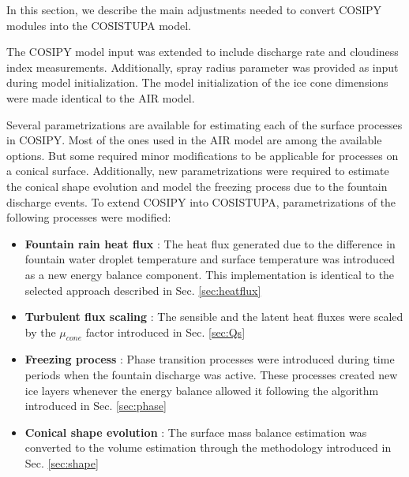 In this section, we describe the main adjustments needed to convert COSIPY modules into the COSISTUPA
model.

The COSIPY model input was extended to include discharge rate and cloudiness index measurements. Additionally,
spray radius parameter was provided as input during model initialization. The model initialization of the ice
cone dimensions were made identical to the AIR model.

Several parametrizations are available for estimating each of the surface processes in COSIPY. Most of the ones
used in the AIR model are among the available options. But some required minor
modifications to be applicable for processes on a conical surface. Additionally, new parametrizations were
required to estimate the conical shape evolution and model the freezing process due to the fountain discharge
events. To extend COSIPY into COSISTUPA, parametrizations of the following processes were modified:


\begin{itemize}

	\item \textbf{Fountain rain heat flux} : The heat flux generated due to the difference in fountain water droplet
	      temperature and surface temperature was introduced as a new energy balance component. This implementation is
	      identical to the selected approach described in Sec. \ref{sec:heatflux}

	\item \textbf{Turbulent flux scaling} : The sensible and the latent heat fluxes were scaled by the $\mu_{cone}$ factor
	      introduced in Sec. \ref{sec:Qs}

	\item \textbf{Freezing process} : Phase transition processes were introduced during time periods when the fountain
	      discharge was active. These processes created new ice layers whenever the energy balance allowed it
	      following the algorithm introduced in Sec. \ref{sec:phase}

	\item \textbf{Conical shape evolution} : The surface mass balance estimation was converted to the volume estimation
	      through the methodology introduced in Sec. \ref{sec:shape}

\end{itemize}

